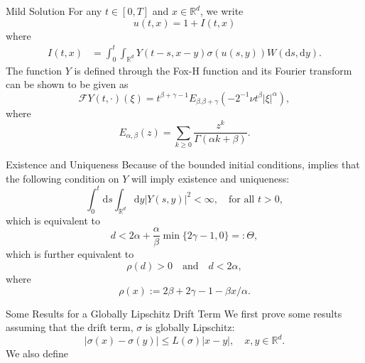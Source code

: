 \documentclass{beamer}%
\numberwithin{equation}{section}
\newcommand{\R}{\mathbb{R}}
\newcommand{\ud}{\ensuremath{\mathrm{d} }}
\begin{document}
\begin{frame}{Mild Solution}
	For any $t \in [0,T]$ and $x \in \R^d$, we write
	\[
	u(t,x) = 1 + I(t,x)
	\]
	where
	\begin{align*}
		I(t,x) &= \int_0^t \int_{\R^d} Y(t-s,x-y)\sigma(u(s,y)) W(\ud s, \ud y).
	\end{align*}
	The function $Y$ is defined through the Fox-H function and its Fourier transform can be shown to be given as 
	\[
	\mathcal{F}Y(t,\cdot)(\xi) = t^{\beta + \gamma-1}E_{\beta. \beta +\gamma}(-2^{-1}\nu t^\beta |\xi|^\alpha),
	\]
	where
	\[
		E_{\alpha,\beta}(z) = \sum_{k \ge 0}\frac{z^k}{\Gamma(\alpha k + \beta)}.
	\]
\end{frame}

	\begin{frame}{Existence and Uniqueness}
Because of the bounded initial conditions, \cite[Theorem 3.1]{CHN19} implies that the following condition on $Y$ will imply existence and uniqueness:
		\begin{equation*}
		\label{C:Dalang}
		\int_0^t \ud s \int_{\R^d} \ud y |Y(s,y)|^2 < \infty, \quad \text{for all } t>0,
		\end{equation*} 
		which is equivalent to
		\begin{equation*}
		\label{E:DalangEquiv}
		d < 2\alpha + \frac{\alpha}{\beta}\min\{2\gamma -1, 0\} =: \Theta,
		\end{equation*}
		which is further equivalent to 
		\begin{equation*}
		\label{E:DalangEquiv2}
		\rho(d) > 0 \quad \text{and} \quad d < 2\alpha,
		\end{equation*}
		where 
		\begin{equation*}
		\label{D:theta}
		\rho(x) := 2\beta + 2\gamma -1 -\beta x / \alpha.
		\end{equation*} 
	\end{frame}

	\begin{frame}{Some Results for a Globally Lipschitz Drift Term}
We first prove some results assuming that the drift term, $\sigma$ is globally Lipschitz:
	\[
		|\sigma(x) - \sigma(y)| \le L(\sigma) |x-y|, \quad x,y \in \R^d.
	\]
We also define 
	\end{frame}
\end{document}
